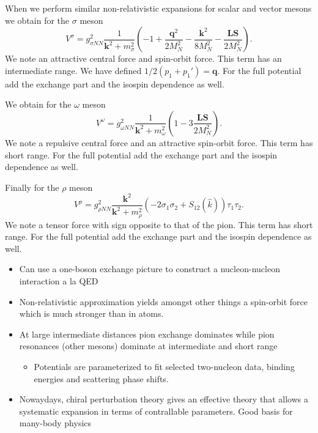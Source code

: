 \documentclass[graybox,sectrefs,envcountresetchap,open=right]{svmonodo}
\begin{document}
When we perform similar non-relativistic expansions for scalar and vector mesons we obtain
for the $\sigma$ meson
\[
V^{\sigma}= g_{\sigma NN}^{2}\frac{1}{\mathbf{k}^{2}+m_{\sigma}^{2}}\left (-1+\frac{\mathbf{q}^{2}}{2M_N^2}
-\frac{\mathbf{k}^{2}}{8M_N^2}-\frac{\mathbf{LS}}{2M_N^2}\right).
\]
We note an attractive central force and spin-orbit force. This term has an intermediate range.
We have defined $1/2(p_{1}+p_{1}')=\mathbf{q}$.
For the full potential add the exchange part and the isospin dependence as well.



We obtain
for the $\omega$ meson
\[
V^{\omega}= g_{\omega NN}^{2}\frac{1}{\mathbf{k}^{2}+m_{\omega}^{2}}\left (1-3\frac{\mathbf{LS}}{2M_N^2}\right).
\]
We note a repulsive central force and an attractive spin-orbit force. This term has  short range.
For the full potential add the exchange part and the isospin dependence as well.


Finally 
for the $\rho$ meson
\[
V^{\rho}= g_{\rho NN}^{2}\frac{\mathbf{k}^{2}}{\mathbf{k}^{2}+m_{\rho}^{2}}\left (
-2\sigma_{1}\sigma_{2}+S_{12}(\hat{k})\right)\tau_{1}\tau_{2}.
\]
We note a tensor force with sign opposite to that of the pion. This term has  short range. For the full potential add the exchange part and the isospin dependence as well.





\begin{itemize}
\item Can use a one-boson exchange picture to construct a nucleon-nucleon interaction a la QED

\item Non-relativistic approximation yields amongst other things a spin-orbit force which is much stronger than in atoms.

\item At large intermediate distances pion exchange dominates while  pion resonances (other mesons) dominate at intermediate and short range 
\begin{itemize}

 \item Potentials are parameterized to fit selected two-nucleon data, binding energies and scattering phase shifts.

\end{itemize}

\noindent
\item Nowaydays, chiral perturbation theory gives an effective theory that allows a systematic expansion in terms of contrallable parameters. Good basis for many-body physics
\end{itemize}
\end{document}
